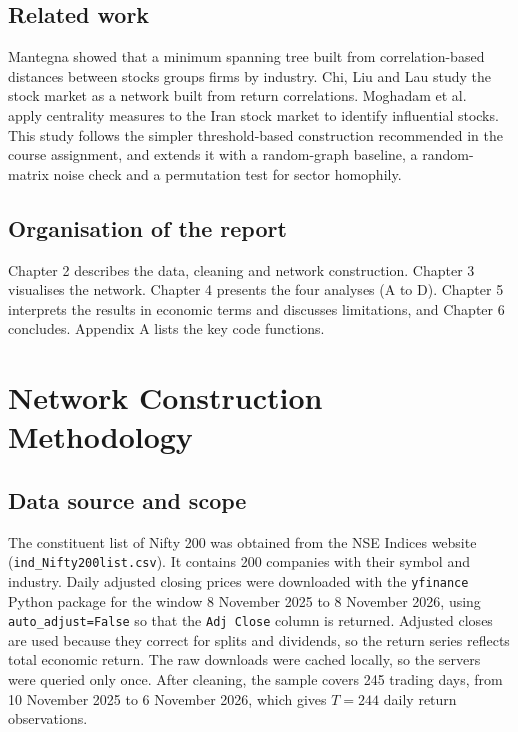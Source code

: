 \documentclass[12pt,a4paper]{report}
\begin{document}
\section{Related work}
Mantegna \cite{mantegna1999} showed that a minimum spanning tree built from correlation-based distances between stocks groups firms by industry. Chi, Liu and Lau \cite{chi2010} study the stock market as a network built from return correlations. Moghadam et al.\ \cite{moghadam2019} apply centrality measures to the Iran stock market to identify influential stocks. This study follows the simpler threshold-based construction recommended in the course assignment, and extends it with a random-graph baseline, a random-matrix noise check and a permutation test for sector homophily.

\section{Organisation of the report}
Chapter 2 describes the data, cleaning and network construction. Chapter 3 visualises the network. Chapter 4 presents the four analyses (A to D). Chapter 5 interprets the results in economic terms and discusses limitations, and Chapter 6 concludes. Appendix A lists the key code functions. 

\chapter{Network Construction Methodology}

\section{Data source and scope}
The constituent list of Nifty 200 was obtained from the NSE Indices website \\(\texttt{ind\_Nifty200list.csv}). It contains 200 companies with their symbol and industry. Daily adjusted closing prices were downloaded with the \texttt{yfinance} Python package for the window 8 November 2025 to 8 November 2026, using \texttt{auto\_adjust=False} so that the \texttt{Adj Close} column is returned. Adjusted closes are used because they correct for splits and dividends, so the return series reflects total economic return. The raw downloads were cached locally, so the servers were queried only once. After cleaning, the sample covers 245 trading days, from 10 November 2025 to 6 November 2026, which gives $T=244$ daily return observations.
\end{document}
